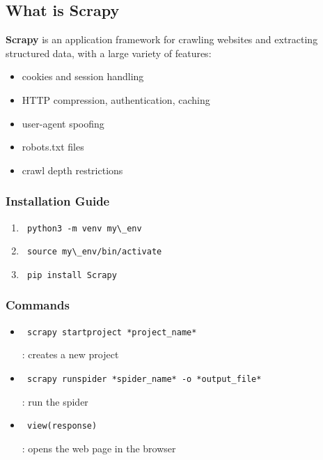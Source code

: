 \documentclass{article}
\begin{document}
\subsection{What is Scrapy}
\textbf{Scrapy} is an application framework for crawling websites and extracting structured data, with a large variety of features: 
\begin{itemize}
    \item cookies and session handling
    \item HTTP compression, authentication, caching
    \item user-agent spoofing
    \item robots.txt files
    \item crawl depth restrictions 
\end{itemize}
\subsubsection{Installation Guide}
\begin{enumerate}
    \item
    \begin{verbatim} python3 -m venv my\_env \end{verbatim}
    \item
    \begin{verbatim} source my\_env/bin/activate \end{verbatim}
    \item
    \begin{verbatim} pip install Scrapy \end{verbatim}
\end{enumerate}
\subsubsection{Commands}
\begin{itemize}
    \item
    \begin{verbatim} scrapy startproject *project_name* \end{verbatim}: creates a new project
    \item
    \begin{verbatim} scrapy runspider *spider_name* -o *output_file* \end{verbatim}: run the spider
    \item 
    \begin{verbatim} view(response) \end{verbatim}: opens the web page in the browser
\end{itemize}
\end{document}
